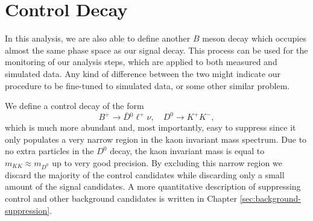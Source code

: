 \section{Control Decay}\label{sec:control-decay}

In this analysis, we are also able to define another $B$ meson decay which occupies almost the same phase space as our signal decay. This process can be used for the monitoring of our analysis steps, which are applied to both measured and simulated data. Any kind of difference between the two might indicate our procedure to be fine-tuned to simulated data, or some other similar problem. 

We define a control decay of the form $$B^+ \to \bar D {}^0 \ell^+ \nu, \quad D^0 \to K^+ K^-,$$ which is much more abundant and, most importantly, easy to suppress since it only populates a very narrow region in the kaon invariant mass spectrum. Due to no extra particles in the $D^0$ decay, the kaon invariant mass is equal to $m_{KK} \approx m_{D^0}$ up to very good precision. By excluding this narrow region we discard the majority of the control candidates while discarding only a small amount of the signal candidates. A more quantitative description of suppressing control and other background candidates is written in Chapter \ref{sec:background-suppression}.